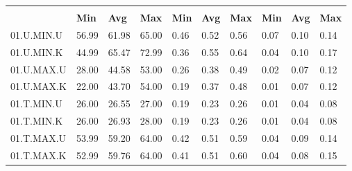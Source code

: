 \begin{tabular}{|>{\raggedright}p{}|>{\raggedright}p{}|>{\raggedright}p{}|>{\raggedright}p{}|>{\raggedright}p{}|>{\raggedright}p{}|>{\raggedright}p{}|>{\raggedright}p{}|>{\raggedright}p{}|>{\raggedright}p{}|}
\hline 
\multirow{2}{0.12\columnwidth}{\textbf{\footnotesize{}Bezeichnung}} & \multicolumn{3}{l|}{\textbf{\footnotesize{}CPU-Last {[}\%{]}}} & \multicolumn{3}{l|}{\textbf{\footnotesize{}Systemtime {[}s{]}}} & \multicolumn{3}{l|}{\textbf{\footnotesize{}Usertime {[}s{]}}}\tabularnewline
\cline{2-10} 
& \textbf{\footnotesize{}Min} & \textbf{\footnotesize{}Avg} & \textbf{\footnotesize{}Max} & \textbf{\footnotesize{}Min} & \textbf{\footnotesize{}Avg} & \textbf{\footnotesize{}Max} & \textbf{\footnotesize{}Min} & \textbf{\footnotesize{}Avg} & \textbf{\footnotesize{}Max}\tabularnewline
\hline 
\hline 
{\footnotesize{}01.U.MIN.U} & {\footnotesize{}56.99} & {\footnotesize{}61.98} & {\footnotesize{}65.00} & {\footnotesize{}0.46} & {\footnotesize{}0.52} & {\footnotesize{}0.56} & {\footnotesize{}0.07} & {\footnotesize{}0.10} & {\footnotesize{}0.14}\tabularnewline
\hline 
\hline 
{\footnotesize{}01.U.MIN.K} & {\footnotesize{}44.99} & {\footnotesize{}65.47} & {\footnotesize{}72.99} & {\footnotesize{}0.36} & {\footnotesize{}0.55} & {\footnotesize{}0.64} & {\footnotesize{}0.04} & {\footnotesize{}0.10} & {\footnotesize{}0.17}\tabularnewline
\hline 
\hline 
{\footnotesize{}01.U.MAX.U} & {\footnotesize{}28.00} & {\footnotesize{}44.58} & {\footnotesize{}53.00} & {\footnotesize{}0.26} & {\footnotesize{}0.38} & {\footnotesize{}0.49} & {\footnotesize{}0.02} & {\footnotesize{}0.07} & {\footnotesize{}0.12}\tabularnewline
\hline 
\hline 
{\footnotesize{}01.U.MAX.K} & {\footnotesize{}22.00} & {\footnotesize{}43.70} & {\footnotesize{}54.00} & {\footnotesize{}0.19} & {\footnotesize{}0.37} & {\footnotesize{}0.48} & {\footnotesize{}0.01} & {\footnotesize{}0.07} & {\footnotesize{}0.12}\tabularnewline
\hline 
\hline 
{\footnotesize{}01.T.MIN.U} & {\footnotesize{}26.00} & {\footnotesize{}26.55} & {\footnotesize{}27.00} & {\footnotesize{}0.19} & {\footnotesize{}0.23} & {\footnotesize{}0.26} & {\footnotesize{}0.01} & {\footnotesize{}0.04} & {\footnotesize{}0.08}\tabularnewline
\hline 
\hline 
{\footnotesize{}01.T.MIN.K} & {\footnotesize{}26.00} & {\footnotesize{}26.93} & {\footnotesize{}28.00} & {\footnotesize{}0.19} & {\footnotesize{}0.23} & {\footnotesize{}0.26} & {\footnotesize{}0.01} & {\footnotesize{}0.04} & {\footnotesize{}0.08}\tabularnewline
\hline 
\hline 
{\footnotesize{}01.T.MAX.U} & {\footnotesize{}53.99} & {\footnotesize{}59.20} & {\footnotesize{}64.00} & {\footnotesize{}0.42} & {\footnotesize{}0.51} & {\footnotesize{}0.59} & {\footnotesize{}0.04} & {\footnotesize{}0.09} & {\footnotesize{}0.14}\tabularnewline
\hline 
\hline 
{\footnotesize{}01.T.MAX.K} & {\footnotesize{}52.99} & {\footnotesize{}59.76} & {\footnotesize{}64.00} & {\footnotesize{}0.41} & {\footnotesize{}0.51} & {\footnotesize{}0.60} & {\footnotesize{}0.04} & {\footnotesize{}0.08} & {\footnotesize{}0.15}\tabularnewline
\hline 
\end{tabular}
\par
